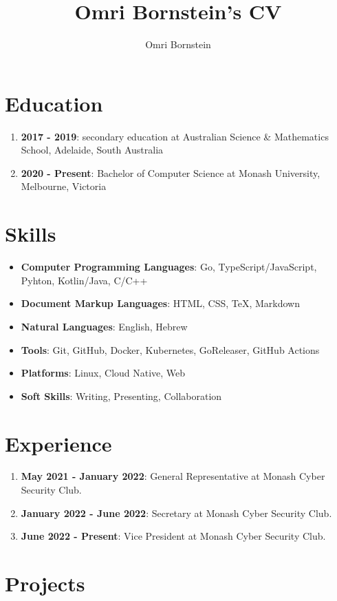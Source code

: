 \documentclass[a4paper]{article}
\title{Omri Bornstein's CV}
\author{Omri Bornstein}
\begin{document}
	\section{Education}

	\begin{enumerate}
		\item \textbf{2017 - 2019}: secondary education at Australian Science \& Mathematics School, Adelaide, South Australia
		\item \textbf{2020 - Present}: Bachelor of Computer Science at Monash University, Melbourne, Victoria
	\end{enumerate}

	\section{Skills}

	\begin{itemize}
		\item \textbf{Computer Programming Languages}: Go, TypeScript/JavaScript, Pyhton, Kotlin/Java, C/C++
		\item \textbf{Document Markup Languages}: HTML, CSS, \TeX, Markdown
		\item \textbf{Natural Languages}: English, Hebrew
		\item \textbf{Tools}: Git, GitHub, Docker, Kubernetes, GoReleaser, GitHub Actions
		\item \textbf{Platforms}: Linux, Cloud Native, Web
		\item \textbf{Soft Skills}: Writing, Presenting, Collaboration
	\end{itemize}

	\section{Experience}

	\begin{enumerate}
		\item \textbf{May 2021 - January 2022}: General Representative at Monash Cyber Security Club.
		\item \textbf{January 2022 - June 2022}: Secretary at Monash Cyber Security Club.
		\item \textbf{June 2022 - Present}: Vice President at Monash Cyber Security Club.
	\end{enumerate}

	\section{Projects}
\end{document}
